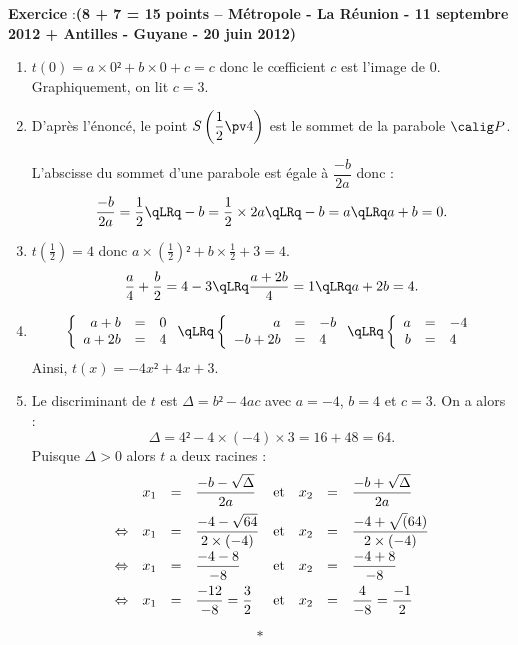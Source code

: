 \documentclass[12pt,french]{article}
\newcounter{exoc}
\newenvironment{exoc}[1]{%
  \refstepcounter{exoc}\textbf{Exercice \theexoc} :\hfill {\footnotesize\textbf{(#1)}}\par
  \medskip}%
{\medskip}
\begin{document}
\begin{exoc}{8 + 7 = 15 points -- Métropole - La Réunion - 11 septembre 2012 + Antilles - Guyane - 20 juin 2012}
\begin{enumerate}
    \item $t(0) = a \times 0² + b\times 0 + c = c$ donc le cœfficient $c$ est l'image de $0$. Graphiquement, on lit $c = 3$.

    \item D'après l'énoncé, le point $S\left(\dfrac 12\pv 4\right)$ est le sommet de la parabole $\calig P$.\par
    L'abscisse du sommet d'une parabole est égale à $\dfrac{-b}{2a}$ donc :
    \[\dfrac{-b}{2a} = \dfrac 12 \qLRq -b = \dfrac 12 \times 2a \qLRq -b = a \qLRq a + b = 0.\]

    \item $t(\frac 12) = 4$ donc $a \times (\frac 1 2)² + b \times \frac 12 + 3 = 4$.
    \[\frac{a}{4} + \frac{b}{2} = 4 - 3 \qLRq \frac{a + 2b}{4} = 1 \qLRq a + 2b = 4.\]

    \item
    \[
    	\left\{
		\begin{array}{rcl}
			a + b & = & 0 \\
			a + 2b & = & 4
		\end{array}
    	\right. \qLRq
	\left\{
		\begin{array}{rcl}
			a & = & -b \\
			-b + 2b & = & 4
		\end{array}
    	\right. \qLRq
    	\left\{
		\begin{array}{rcl}
			a & = & -4 \\
			b & = & 4
		\end{array}
    	\right.
    \]
Ainsi, $t(x) = -4x² + 4x + 3$.

    \item Le discriminant de $t$ est $\Delta = b² - 4ac$ avec $a = -4$, $b = 4$ et $c = 3$. On a alors :
        \[\Delta = 4² - 4 \times (-4) \times 3 = 16 + 48 = 64.\]
        Puisque $\Delta > 0$ alors $t$ a deux racines :
        \[\begin{array}{crcl@{\quad \text{et}\quad}rcl}
          	&x_1 & = & \dfrac{-b - \sqrt\Delta}{2a} & x_2 & = & \dfrac{-b + \sqrt\Delta}{2a} \\[8pt]
          	\Leftrightarrow &x_1 & = & \dfrac{-4 - \sqrt{64}}{2\times (-4)} & x_2 & = & \dfrac{-4 + \sqrt(64)}{2\times (-4)} \\[8pt]
          	\Leftrightarrow &x_1 & = & \dfrac{-4 - 8}{-8} & x_2 & = & \dfrac{-4 + 8}{-8} \\[8pt]
          	\Leftrightarrow &x_1 & = & \dfrac{-12}{-8} = \dfrac 32 & x_2 & = & \dfrac{4}{-8} = \dfrac{-1}{2}
          \end{array}\]
\end{enumerate}
\end{exoc}\[*\]
\end{document}
